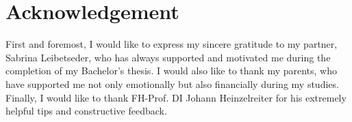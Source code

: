 \section*{Acknowledgement}
First and foremost, I would like to express my sincere gratitude to my partner, Sabrina Leibetseder, who has always supported and motivated me during the completion of my Bachelor's thesis. I would also like to thank my parents, who have supported me not only emotionally but also financially during my studies. Finally, I would like to thank FH-Prof. DI Johann Heinzelreiter for his extremely helpful tips and constructive feedback.